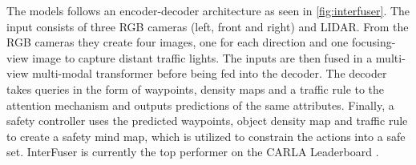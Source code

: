 The models follows an encoder-decoder architecture as seen in \cref{fig:interfuser}. The input consists of three RGB cameras (left, front and right) and LIDAR. From the RGB cameras they create four images, one for each direction and one focusing-view image to capture distant traffic lights. The inputs are then fused in a multi-view multi-modal transformer before being fed into the decoder. The decoder takes queries in the form of waypoints, density maps and a traffic rule to the attention mechanism and outputs predictions of the same attributes. Finally, a safety controller uses the predicted waypoints, object density map and traffic rule to create a safety mind map, which is utilized to constrain the actions into a safe set. InterFuser is currently the top performer on the CARLA Leaderboard \cite{shao2022interfuser, pwc-carla}.


